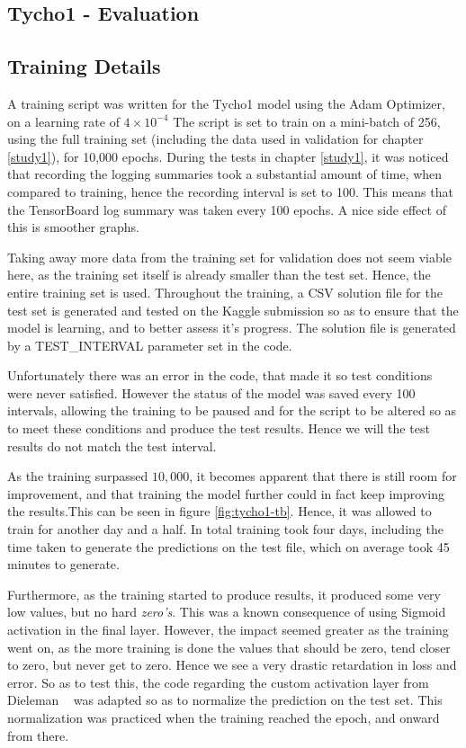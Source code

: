 \documentclass[12pt,a4paper,oneside,oldfontcommands]{memoir}
\begin{document}
\begin{Declaration Of OriginalityOrginality}
\chapter{Tycho1 - Evaluation} \label{tycho1} 

\section{Training Details}

A training script was written for the Tycho1 model using the Adam Optimizer, on a learning rate of \(4\times10^{-4}\) The script is set to train on a mini-batch of 256, using the full training set (including the data used in validation for chapter \ref{study1}), for 10,000 epochs. During the tests in chapter \ref{study1}, it was noticed that recording the logging summaries took a substantial amount of time, when compared to training, hence the recording interval is set to 100. This means that the TensorBoard log summary was taken every 100 epochs. A nice side effect of this is smoother graphs.

Taking away more data from the training set for validation does not seem viable here, as the training set itself is already smaller than the test set. Hence, the entire training set is used. Throughout the training, a CSV solution file for the test set is generated and tested on the Kaggle submission so as to ensure that the model is learning, and to better assess it's progress. The solution file is generated by a TEST\_INTERVAL parameter set in the code. 

Unfortunately there was an error in the code, that made it so test conditions were never satisfied. However the status of the model was saved every 100 intervals, allowing the training to be paused and for the script to be altered so as to meet these conditions and produce the test results. Hence we will the test results do not match the test interval. 

As the training surpassed \(10,000\), it becomes apparent that there is still room for improvement, and that training the model further could in fact keep improving the results.This can be seen in figure \ref{fig:tycho1-tb}. Hence, it was allowed to train for another day and a half. In total training took four days, including the time taken to generate the predictions on the test file, which on average took 45 minutes to generate. 

Furthermore, as the training started to produce results, it produced some very low values, but no hard \textit{zero's}. This was a known consequence of using Sigmoid activation in the final layer. However, the impact seemed greater as the training went on, as the more training is done the values that should be zero, tend closer to zero, but never get to zero. Hence we see a very drastic retardation in loss and error. So as to test this, the code regarding the custom activation layer from Dieleman ~\cite{Sanders-GZ} was adapted so as to normalize the prediction on the test set. This normalization was practiced when the training reached the  epoch, and onward from there. 


\end{Declaration Of OriginalityOrginality}
\end{document}
